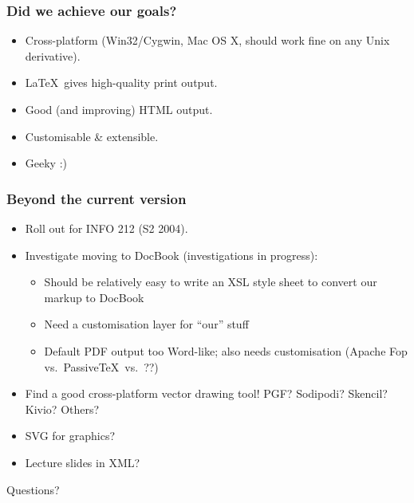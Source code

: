 \documentclass[pdftex]{beamer}
\begin{document}
\frame
{
	\frametitle{Did we achieve our goals?}
	
	\begin{itemize}
	
		\item Cross-platform (Win32/Cygwin, Mac OS X, should work fine
		on any Unix derivative).
		
		\item \LaTeX\ gives high-quality print output.
		
		\item Good (and improving) HTML output.
		
		\item Customisable \& extensible.
		
		\item Geeky :)
		
	\end{itemize}
	
	\begin{center}
	
	
	\end{center}
}


\frame
{
	\frametitle{Beyond the current version}
	
	\begin{itemize}
	
		\item Roll out for INFO 212 (S2 2004).
		
		\item Investigate moving to DocBook (investigations in
		progress):
		
		\begin{itemize}
		
			\item Should be relatively easy to write an XSL style sheet
			to convert our markup to DocBook
			
			\item Need a customisation layer for ``our'' stuff
			
			\item Default PDF output too Word-like; also needs
			customisation (Apache Fop vs.\ Passive\TeX\ vs.\ ??)
			
		\end{itemize}
		
		\item Find a good cross-platform vector drawing tool! PGF?
		Sodipodi? Skencil? Kivio? Others?
		
		\item SVG for graphics?
		
		\item Lecture slides in XML?
		
	
	\end{itemize}
}


\frame
{
	\centering\Huge{\alert{Questions?}}
}
\end{document}
